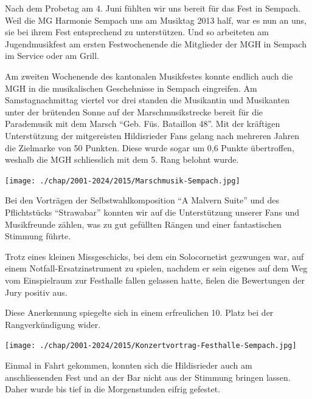 \begin{history}


    Nach dem Probetag am 4. Juni fühlten wir uns bereit für das Fest in Sempach.
    Weil die MG Harmonie Sempach uns am Musiktag 2013 half, war es nun an uns,
    sie bei ihrem Fest entsprechend zu unterstützen. Und so arbeiteten am
    Jugendmusikfest am ersten Festwochenende die Mitglieder der MGH in Sempach
    im Service oder am Grill.

    Am zweiten Wochenende des kantonalen Musikfestes konnte endlich auch die MGH
    in die musikalischen Geschehnisse in Sempach eingreifen. Am
    Samstagnachmittag viertel vor drei standen die Musikantin und Musikanten
    unter der brütenden Sonne auf der Marschmusikstrecke bereit für die
    Parademusik mit dem Marsch \enquote{Geb. Füs. Bataillon 48}. Mit der
    kräftigen Unterstützung der mitgereisten Hildisrieder Fans gelang nach
    mehreren Jahren die Zielmarke von 50 Punkten. Diese wurde sogar um 0,6
    Punkte übertroffen, weshalb die MGH schliesslich mit dem 5. Rang belohnt
    wurde.

    \begin{MulticolFigure}
        \centering
        \texttt{[image: ./chap/2001-2024/2015/Marschmusik-Sempach.jpg]}
    \end{MulticolFigure}

    Bei den Vorträgen der Selbstwahlkomposition \enquote{A Malvern Suite} und
    des Pflichtstücks \enquote{Strawabar} konnten wir auf die Unterstützung
    unserer Fans und Musikfreunde zählen, was zu gut gefüllten Rängen und einer
    fantastischen Stimmung führte.

    Trotz eines kleinen Missgeschicks, bei dem ein Solocornetist gezwungen war,
    auf einem Notfall-Ersatzinstrument zu spielen, nachdem er sein eigenes auf
    dem Weg vom Einspielraum zur Festhalle fallen gelassen hatte, fielen die
    Bewertungen der Jury positiv aus.

    Diese Anerkennung spiegelte sich in einem erfreulichen 10. Platz bei der
    Rangverkündigung wider.

    \begin{MulticolFigure}
        \centering
        \texttt{[image: ./chap/2001-2024/2015/Konzertvortrag-Festhalle-Sempach.jpg]}
    \end{MulticolFigure}

    Einmal in Fahrt gekommen, konnten sich die Hildisrieder auch am
    anschliessenden Fest und an der Bar nicht aus der Stimmung bringen lassen.
    Daher wurde bis tief in die Morgenstunden eifrig gefestet.

\end{history}


